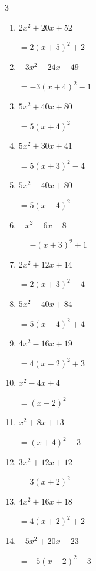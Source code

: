 \begin{multicols}{3}
\begin{enumerate}
        $=-2\left( x+2\right)^{2}+3$

  \item $2x^{2}+20x+52$

        $=2\left( x+5\right)^{2}+2$

  \item $-3x^{2}-24x-49$

        $=-3\left( x+4\right)^{2}-1$

  \item $5x^{2}+40x+80$

        $=5\left( x+4\right)^{2}$

  \item $5x^{2}+30x+41$

        $=5\left( x+3\right)^{2}-4$

  \item $5x^{2}-40x+80$

        $=5\left( x-4\right)^{2}$

  \item $-x^{2}-6x-8$

        $=-\left( x+3\right)^{2}+1$

  \item $2x^{2}+12x+14$

        $=2\left( x+3\right)^{2}-4$

  \item $5x^{2}-40x+84$

        $=5\left( x-4\right)^{2}+4$

\columnbreak %

  \item $4x^{2}-16x+19$

        $=4\left( x-2\right)^{2}+3$

  \item $x^{2}-4x+4$

        $=\left( x-2\right)^{2}$

  \item $x^{2}+8x+13$

        $=\left( x+4\right)^{2}-3$

  \item $3x^{2}+12x+12$

        $=3\left( x+2\right)^{2}$

  \item $4x^{2}+16x+18$

        $=4\left( x+2\right)^{2}+2$

  \item $-5x^{2}+20x-23$

        $=-5\left( x-2\right)^{2}-3$


\end{enumerate}
\end{multicols}
